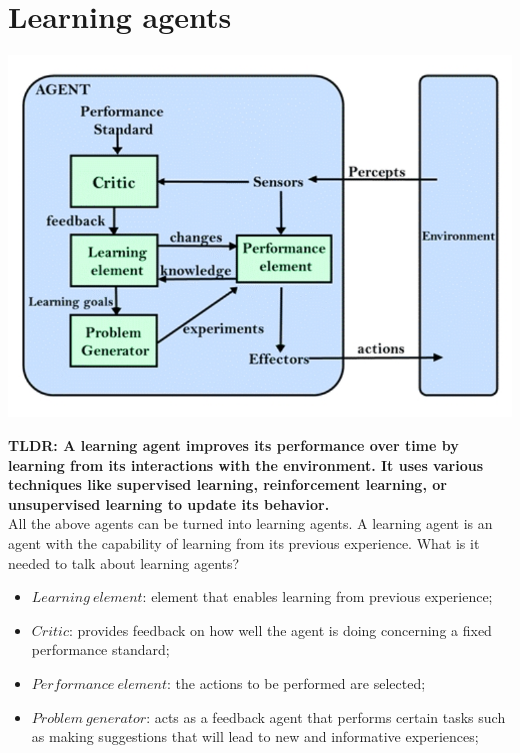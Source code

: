 \documentclass{article}
\begin{document}
\section{Learning agents}

\begin{center}
    \includegraphics[scale=0.4]{images/learning_agent.jpg}
\end{center}

\textbf{TLDR: A learning agent improves its performance over time by learning from its interactions with the environment. It uses various techniques like supervised learning, reinforcement learning, or unsupervised learning to update its behavior.} \\

All the above agents can be turned into learning agents. A learning agent is an agent with the capability of learning from its previous experience. What is it needed to talk about learning agents?

\begin{itemize}
    \item $Learning\ element$: element that enables learning from previous experience;
    \item $Critic$: provides feedback on how well the agent is doing concerning a fixed performance standard;
    \item $Performance\ element$: the actions to be performed are selected;
    \item $Problem\ generator$: acts as a feedback agent that performs certain tasks such as making suggestions that will lead to new and informative experiences;
\end{itemize}
\end{document}

